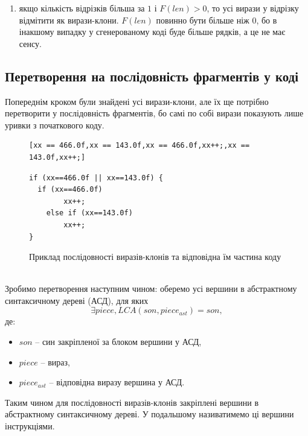 \documentclass[a4paper, 14pt]{article}
\begin{document}
\begin{itemize}
{\begin{enumerate}[label={{\arabic*})}]
{де:
\begin{itemize}
\item $len*goodGraphs$ -- приблизна початкова кількість рядків коду;
\item $goodGraphs$ -- кількість потрібних викликів нової функції, кожен виклик зазвичай займає 1 рядок;
\item $2*T*goodGraphs$ -- приблизна кількість рядків коду, потрібного для врахування усіх відмінностей між послідовностями виразів;
\item $len$ -- приблизна кількість рядків коду, що є повністю ідентичним між усіма послідовностями;
\item $2$ -- кількість рядків, необхідна щоб записати функцію у коді.
\end{itemize}
$$F(len) = len*goodGraphs-goodGraphs-2*T*goodGraphs-len-2$$
$$F(len) = (len-1)*goodGraphs-2*T*goodGraphs-len-2$$
$$F(len) = (len-2*T-1)*goodGraphs-len-2;$$
}
\item якщо кількість відрізків більша за $1$ і $F(len)>0$, то усі вирази у відрізку відмітити як вирази-клони.
$F(len)$ повинно бути більше ніж 0, бо в інакшому випадку у сгенерованому коді буде більше рядків, а це не має сенсу.
\end{enumerate}
}
\end{itemize}
\subsection{Перетворення на послідовність фрагментів у коді}
Попереднім кроком були знайдені усі вирази-клони, але їх ще потрібно перетворити у послідовність фрагментів, бо самі по собі вирази показують лише уривки з початкового коду.   
\begin{figure}[h!]
\centering
\begin{minipage}{.5\textwidth}
\begin{lstlisting}[frame=none]
[xx == 466.0f,xx == 143.0f,xx == 466.0f,xx++;,xx == 143.0f,xx++;]
\end{lstlisting}
\end{minipage}
\begin{minipage}{.4\textwidth}
\begin{lstlisting}[frame=none]
if (xx==466.0f || xx==143.0f) {
  if (xx==466.0f)
		xx++;
	else if (xx==143.0f)
		xx++;
}	
\end{lstlisting}
\end{minipage}
\caption{Приклад послідовності виразів-клонів та відповідна їм частина коду}
\end{figure} \\
Зробимо перетворення наступним чином: оберемо усі вершини в абстрактному синтаксичному дереві (АСД), для яких
$$\exists piece, LCA(son, piece_{ast}) = son,$$
де:
\begin{itemize}
\item $son$ -- син закріпленої за блоком вершини у АСД, 
\item $piece$ -- вираз, 
\item $piece_{ast}$ -- відповідна виразу вершина у АСД.
\end{itemize}
Таким чином для послідовності виразів-клонів закріплені вершини в абстрактному синтаксичному дереві.
У подальшому називатимемо ці вершини інструкціями.
\end{document}
